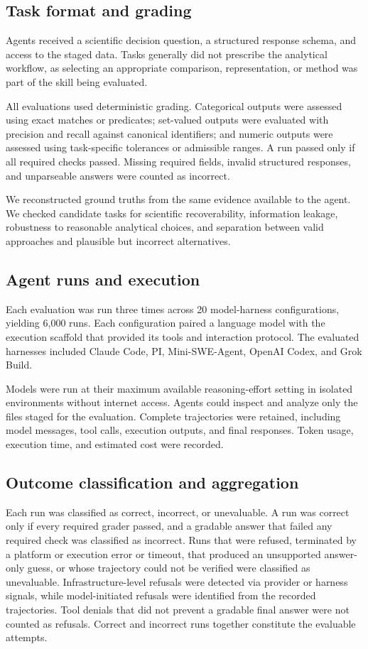 \documentclass[10pt,letterpaper]{article}
\begin{document}
\subsection{Task format and grading}
Agents received a scientific decision question, a structured response schema, and access to the staged data. Tasks generally did not prescribe the analytical workflow, as selecting an appropriate comparison, representation, or method was part of the skill being evaluated.

All evaluations used deterministic grading. Categorical outputs were assessed using exact matches or predicates; set-valued outputs were evaluated with precision and recall against canonical identifiers; and numeric outputs were assessed using task-specific tolerances or admissible ranges. A run passed only if all required checks passed. Missing required fields, invalid structured responses, and unparseable answers were counted as incorrect.

We reconstructed ground truths from the same evidence available to the agent. We checked candidate tasks for scientific recoverability, information leakage, robustness to reasonable analytical choices, and separation between valid approaches and plausible but incorrect alternatives.

\subsection{Agent runs and execution}
Each evaluation was run three times across 20 model-harness configurations, yielding 6,000 runs. Each configuration paired a language model with the execution scaffold that provided its tools and interaction protocol. The evaluated harnesses included Claude Code, PI, Mini-SWE-Agent, OpenAI Codex, and Grok Build.
 
Models were run at their maximum available reasoning-effort setting in isolated environments without internet access. Agents could inspect and analyze only the files staged for the evaluation. Complete trajectories were retained, including model messages, tool calls, execution outputs, and final responses. Token usage, execution time, and estimated cost were recorded.

\subsection{Outcome classification and aggregation}
Each run was classified as correct, incorrect, or unevaluable. A run was correct only if every required grader passed, and a gradable answer that failed any required check was classified as incorrect. Runs that were refused, terminated by a platform or execution error or timeout, that produced an unsupported answer-only guess, or whose trajectory could not be verified were classified as unevaluable. Infrastructure-level refusals were detected via provider or harness signals, while model-initiated refusals were identified from the recorded trajectories. Tool denials that did not prevent a gradable final answer were not counted as refusals. Correct and incorrect runs together constitute the evaluable attempts.
\end{document}
